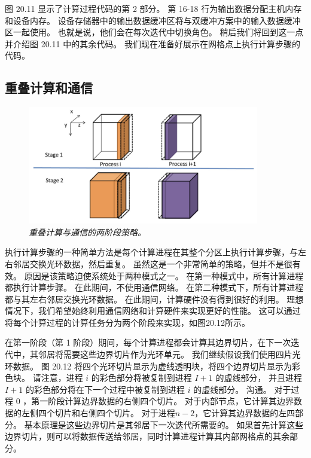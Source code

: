 图 20.11 显示了计算过程代码的第 2 部分。 第 16-18 行为输出数据分配主机内存和设备内存。 
设备存储器中的输出数据缓冲区将与双缓冲方案中的输入数据缓冲区一起使用。 
也就是说，他们会在每次迭代中切换角色。 稍后我们将回到这一点并介绍图 20.11 中的其余代码。 
我们现在准备好展示在网格点上执行计算步骤的代码。

\subsection{重叠计算和通信}
\begin{figure}[H]
	\centering
	\includegraphics[width=0.9\textwidth]{figs/F20.12.png}
	\caption{\textit{重叠计算与通信的两阶段策略。}}
\end{figure}

执行计算步骤的一种简单方法是每个计算进程在其整个分区上执行计算步骤，与左右邻居交换光环数据，然后重复。 
虽然这是一个非常简单的策略，但并不是很有效。 原因是该策略迫使系统处于两种模式之一。 
在第一种模式中，所有计算进程都执行计算步骤。 在此期间，不使用通信网络。 
在第二种模式下，所有计算进程都与其左右邻居交换光环数据。 在此期间，计算硬件没有得到很好的利用。 
理想情况下，我们希望始终利用通信网络和计算硬件来实现更好的性能。 
这可以通过将每个计算过程的计算任务分为两个阶段来实现，如图20.12所示。

在第一阶段（第 1 阶段）期间，每个计算进程都会计算其边界切片，在下一次迭代中，其邻居将需要这些边界切片作为光环单元。 
我们继续假设我们使用四片光环数据。 图 20.12 将四个光环切片显示为虚线透明块，将四个边界切片显示为彩色块。 
请注意，进程 $i$ 的彩色部分将被复制到进程 $I+1$ 的虚线部分，
并且进程 $I+1$ 的彩色部分将在下一个过程中被复制到进程 $i$ 的虚线部分。 
沟通。 对于过程 0 ，第一阶段计算边界数据的右侧四个切片。 对于内部节点，它计算其边界数据的左侧四个切片和右侧四个切片。 
对于进程$n-2$，它计算其边界数据的左四部分。 基本原理是这些边界切片是其邻居下一次迭代所需要的。 
如果首先计算这些边界切片，则可以将数据传送给邻居，同时计算进程计算其内部网格点的其余部分。

